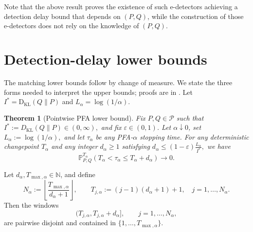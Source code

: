 \documentclass[12pt]{article}
\theoremstyle{spaced}
\newtheorem{theorem}{Theorem}[section]
\theoremstyle{remark}
\newcommand{\KL}{\mathrm{D}_{\text{KL}}}
\begin{document}
Note that the above result proves the existence of such e-detectors achieving a detection delay bound that depends on $(P,Q)$, while the construction of those e-detectors does not rely on the knowledge of $(P,Q)$. 


\section{Detection-delay lower bounds}
\label{sec:lowerb}
The matching lower bounds follow by change of measure.  We state the three
forms needed to interpret the upper bounds; proofs are in .  Let $I^*=\KL(Q\|P)$ and
$L_\alpha=\log(1/\alpha)$.

\begin{theorem}[Pointwise PFA lower bound]
\label{thm:pointwise-lower}
Fix \(P,Q\in\mathcal P\) such that
$I^*:=D_{\mathrm{KL}}(Q\|P)\in(0,\infty),$
and fix \(\varepsilon\in(0,1)\). Let \(\alpha\downarrow0\), set
$L_\alpha:=\log(1/\alpha),$
and let \(\tau_\alpha\) be any PFA-\(\alpha\) stopping time. For any
deterministic changepoint \(T_\alpha\) and any integer \(d_\alpha\ge1\)
satisfying
$d_\alpha
    \le
    (1-\varepsilon)\frac{L_\alpha}{I^*},$
we have
\[
    \mathbb P_{P,Q}^{T_\alpha}
    \left(
        T_\alpha<\tau_\alpha\le T_\alpha+d_\alpha
    \right)
    \longrightarrow0.
\]
\end{theorem}

Let \(d_\alpha,T_{\max,\alpha}\in\mathbb N\), and define
\[
    N_\alpha
    :=
    \left\lfloor
        \frac{T_{\max,\alpha}}{d_\alpha+1}
    \right\rfloor,
    \qquad
    T_{j,\alpha}
    :=
    (j-1)(d_\alpha+1)+1,
    \quad
    j=1,\ldots,N_\alpha.
\]
Then the windows
\[
    (T_{j,\alpha},T_{j,\alpha}+d_\alpha],
    \qquad j=1,\ldots,N_\alpha,
\]
are pairwise disjoint and contained in
\(\{1,\ldots,T_{\max,\alpha}\}\).
\end{document}
